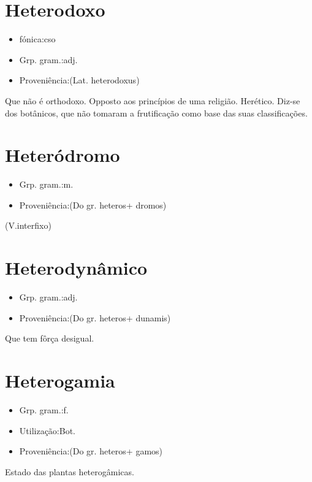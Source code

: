 \documentclass{article}
\begin{document}
\section{Heterodoxo}
\begin{itemize}
\item {fónica:cso}
\end{itemize}
\begin{itemize}
\item {Grp. gram.:adj.}
\end{itemize}
\begin{itemize}
\item {Proveniência:(Lat. \textunderscore heterodoxus\textunderscore )}
\end{itemize}
Que não é orthodoxo.
Opposto aos princípios de uma religião.
Herético.
Diz-se dos botânicos, que não tomaram a frutificação como base das suas classificações.
\section{Heteródromo}
\begin{itemize}
\item {Grp. gram.:m.}
\end{itemize}
\begin{itemize}
\item {Proveniência:(Do gr. \textunderscore heteros\textunderscore  + \textunderscore dromos\textunderscore )}
\end{itemize}
(V.interfixo)
\section{Heterodynâmico}
\begin{itemize}
\item {Grp. gram.:adj.}
\end{itemize}
\begin{itemize}
\item {Proveniência:(Do gr. \textunderscore heteros\textunderscore  + \textunderscore dunamis\textunderscore )}
\end{itemize}
Que tem fôrça desigual.
\section{Heterogamia}
\begin{itemize}
\item {Grp. gram.:f.}
\end{itemize}
\begin{itemize}
\item {Utilização:Bot.}
\end{itemize}
\begin{itemize}
\item {Proveniência:(Do gr. \textunderscore heteros\textunderscore  + \textunderscore gamos\textunderscore )}
\end{itemize}
Estado das plantas heterogâmicas.
\end{document}

